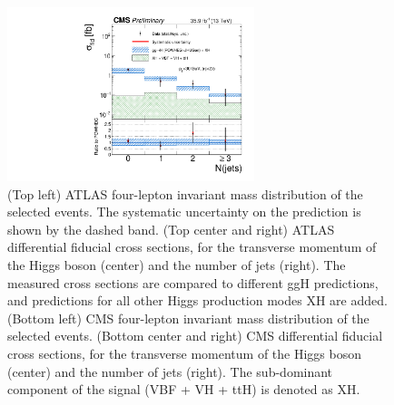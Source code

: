 \documentclass[10pt]{article}
\begin{document}
\begin{figure}[htb]
\includegraphics[height=2in]{figures/CMS-HIG-16-041__Figure_009-c__njets.pdf}
\caption{
  (Top left) ATLAS four-lepton invariant mass distribution of the selected
  events. The systematic uncertainty on the prediction is shown by the dashed
  band.
  (Top center and right) ATLAS differential fiducial cross sections, for the
  transverse momentum of the Higgs boson (center) and the number of jets (right).
  The measured cross sections are compared to different ggH predictions, and
  predictions for all other Higgs production modes XH are added.
  (Bottom left) CMS four-lepton invariant mass distribution of the selected
  events.
  (Bottom center and right) CMS differential fiducial cross sections, for the
  transverse momentum of the Higgs boson (center) and the number of jets (right).
  The sub-dominant component of the signal (VBF + VH + ttH) is denoted as XH.
}
\label{fig:figure-ZZ}
\end{figure}
\end{document}
